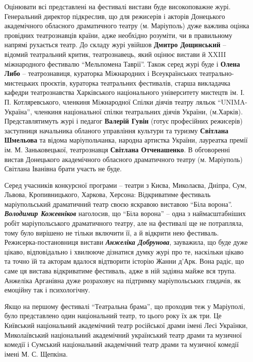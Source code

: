 Оцінювати всі представлені на фестивалі вистави буде високоповажне журі.
Генеральний директор підкреслив, що для режисерів і акторів Донецького
академічного обласного драматичного театру (м. Маріуполь) дуже важлива оцінка
провідних театрознавців країни, адже необхідно розуміти, чи в правильному
напрямі рухається театр. До складу журі увійшов \textbf{Дмитро Дощинський} – відомий
театральний критик, театрознавець, який оцінює вистави й XXIII міжнародного
фестивалю \enquote{Мельпомена Таврії}. Також серед журі буде і \textbf{Олена Либо} –
театрознавиця, кураторка Міжнародних і Всеукраїнських театрально-мистецьких
проєктів, кураторка театральних фестивалів, старша викладачка кафедри
театрознавства Харківського національного університету мистецтв ім.
І. П. Котляревського, членкиня Міжнародної Спілки діячів театру ляльок
\enquote{UNIMA-Україна}, членкиня національної спілки театральних діячів України,
(м.Харків). Представлятимуть журі і педагог \textbf{Валерій Гувін} (готує професійних
режисерів) заступниця начальника обланого управління культури та туризму
\textbf{Світлана Шмельова} та відома маріупольчанка, народна артистка України, лауреатка
премії ім. М. Заньковецької, театрознавця \textbf{Світлана Отченашенко}. В обговоренні
вистав Донецького академічного обласного драматичного театру (м. Маріуполь)
Світлана Іванівна брати участь не буде.

Серед учасників конкурсної програми – театри з Києва, Миколаєва, Дніпра, Сум,
Львова, Кропивницького, Харкова, Херсона: Відкриватиме фестиваль маріупольський
драматичний театр своєю яскравою виставою \enquote{Біла ворона}. \emph{\textbf{Володимир Кожевніков}}
наголосив, що \enquote{Біла ворона} – одна з наймасштабніших робіт маріупольського
драматичного театру, але на фестивалі ще не потрапляла, тому було вирішено не
тільки включити її, а й відкрити нею фестиваль. Режисерка-постановниця вистави
\emph{\textbf{Анжеліка Добрунова}}, зауважила, що буде дуже цікаво, відповідально і хвилююче
дізнатися думку журі про те, наскільки цікаво та точно їй та акторам вдалося
відтворити історію Жанни д'Арк. Вона радіє, що саме ця вистава відкриватиме
фестиваль, адже в ній задіяна майже вся трупа. Анжеліка Арганівна дуже
розраховує на підтримку маріупольських глядачів, як емоційну так і
психологічну.

Якщо на першому фестивалі \enquote{Театральна брама}, що проходив теж  у Маріуполі,
було представлено один національний театр, то цього року їх аж три. Це
Київський національний академічний театр російської драми імені Лесі Українки,
Миколаївський національний академічний український театр драми та музичної
комедії і Сумський національний академічний театр драми та музичної комедії
імені М. С. Щепкіна.


